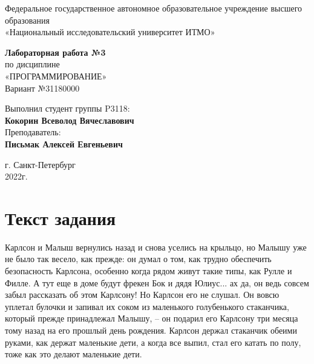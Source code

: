 \documentclass[12pt,onecolumn]{article}
\begin{document}
\begin{center}
    Федеральное государственное автономное образовательное учреждение высшего образования\\
	«Национальный исследовательский университет ИТМО»
\end{center}
\vspace{1cm}


\begin{center}
    \large \textbf{Лабораторная работа №3}\\
    по дисциплине\\
    «ПРОГРАММИРОВАНИЕ»\\
	\vspace{1cm}
    Вариант №31180000\\
\end{center}

\vspace{10cm}
\begin{flushright}
  Выполнил студент  группы P3118: \\
  \textbf{Кокорин Всеволод Вячеславович}\\
  Преподаватель: \\
  \textbf{Письмак Алексей Евгеньевич}\\
\end{flushright}

\vspace{5cm}
\begin{center}
    г. Санкт-Петербург\\
    2022г.
\end{center}
\newpage
\tableofcontents
\newpage
\section{Текст задания}
Карлсон и Малыш вернулись назад и снова уселись на крыльцо, но Малышу уже не было так весело, как прежде: он думал о том, как трудно обеспечить безопасность Карлсона, особенно когда рядом живут такие типы, как Рулле и Филле. А тут еще в доме будут фрекен Бок и дядя Юлиус... ах да, он ведь совсем забыл рассказать об этом Карлсону! Но Карлсон его не слушал. Он вовсю уплетал булочки и запивал их соком из маленького голубенького стаканчика, который прежде принадлежал Малышу, -- он подарил его Карлсону три месяца тому назад на его прошлый день рождения. Карлсон держал стаканчик обеими руками, как держат маленькие дети, а когда все выпил, стал его катать по полу, тоже как это делают маленькие дети.
\newpage
\end{document}
